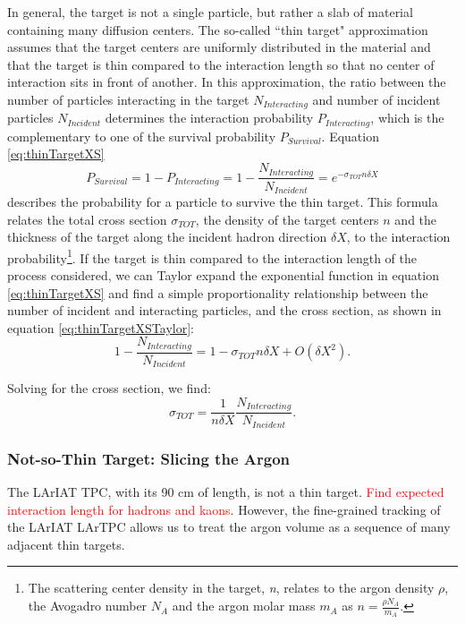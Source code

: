 In general, the target is not a single particle, but rather a slab of material containing many diffusion centers. The so-called  ``thin target" approximation assumes that the target centers are uniformly distributed in the material and that the target is thin compared to the interaction length so that no center of interaction sits in front of another. In this approximation, the ratio between the number of particles interacting in the target $N_{Interacting}$ and number of incident particles $N_{Incident}$ determines the interaction probability $P_{Interacting}$, which is the complementary to one of the survival probability $P_{Survival}$. 
Equation \ref{eq:thinTargetXS} 
\begin{equation}
P_{Survival} = 1- P_{Interacting} = 1 - \frac{N_{Interacting}}{N_{Incident}} = e^{-\sigma_{TOT} n \delta X}
\label{eq:thinTargetXS}
\end{equation}
describes the probability for a particle to survive the thin target. This formula relates the total cross section $\sigma_{TOT}$, the density of the target centers  $n$  and  the thickness of the target  along the incident hadron direction $\delta X$, to the interaction probability\footnote{The scattering center density in the target, {\emph{n}},  relates to the argon density $\rho$, the Avogadro number  $ N_{A} $ and the argon molar mass $m_A$ as $n=\frac{\rho N_{A} }{m_A}$.}. If the target is thin compared to the interaction length of the process considered, we can Taylor expand the exponential function in equation \ref{eq:thinTargetXS} and find a simple proportionality relationship between the number of incident and interacting particles, and the cross section, as shown in equation \ref{eq:thinTargetXSTaylor}:
\begin{equation}
1 - \frac{N_{Interacting}}{N_{Incident}} =  1 -\sigma_{TOT} n \delta X + O(\delta X^2).
\label{eq:thinTargetXSTaylor}
\end{equation}

Solving for the cross section, we find:
\begin{equation}
 \sigma_{TOT}  = \frac{1}{n \delta X}\frac{N_{Interacting}}{N_{Incident}}.
\label{eq:thinTargetXSSolved}
\end{equation}

\subsubsection{Not-so-Thin Target: Slicing the Argon}
The LArIAT TPC, with its 90 cm of length, is not a thin target. \textcolor{red}{Find expected interaction length for hadrons and kaons}. However, the fine-grained tracking of the LArIAT LArTPC allows us to treat the argon volume as a sequence of many adjacent thin targets. 

